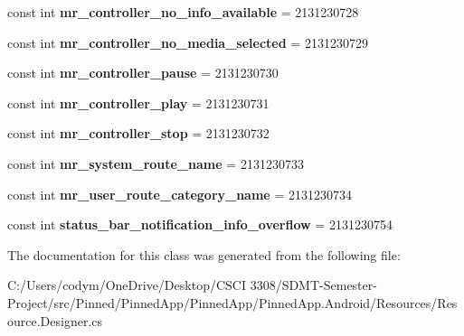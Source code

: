 \begin{DoxyCompactItemize}
\mbox{\label{class_pinned_app_1_1_droid_1_1_resource_1_1_string_ab29848b90ba4f93eec5f2a517f9a5436}} 
const int {\bfseries mr\+\_\+controller\+\_\+no\+\_\+info\+\_\+available} = 2131230728
\item 
\mbox{\label{class_pinned_app_1_1_droid_1_1_resource_1_1_string_a6ac2edca3685d179970a1c872b9169b0}} 
const int {\bfseries mr\+\_\+controller\+\_\+no\+\_\+media\+\_\+selected} = 2131230729
\item 
\mbox{\label{class_pinned_app_1_1_droid_1_1_resource_1_1_string_a5347f6fba94ff7904111a294c083fb0e}} 
const int {\bfseries mr\+\_\+controller\+\_\+pause} = 2131230730
\item 
\mbox{\label{class_pinned_app_1_1_droid_1_1_resource_1_1_string_a3b88a8bccacfc357aaf8948201512eea}} 
const int {\bfseries mr\+\_\+controller\+\_\+play} = 2131230731
\item 
\mbox{\label{class_pinned_app_1_1_droid_1_1_resource_1_1_string_aa29a4dc015b392f28554fd0fe2c2bd8a}} 
const int {\bfseries mr\+\_\+controller\+\_\+stop} = 2131230732
\item 
\mbox{\label{class_pinned_app_1_1_droid_1_1_resource_1_1_string_a3705dae31754e15326437327157df3f3}} 
const int {\bfseries mr\+\_\+system\+\_\+route\+\_\+name} = 2131230733
\item 
\mbox{\label{class_pinned_app_1_1_droid_1_1_resource_1_1_string_a384b4934bfa5dfcc9cddb137f072c4ec}} 
const int {\bfseries mr\+\_\+user\+\_\+route\+\_\+category\+\_\+name} = 2131230734
\item 
\mbox{\label{class_pinned_app_1_1_droid_1_1_resource_1_1_string_ac0d50512261a5c4380fe00d68bb78a85}} 
const int {\bfseries status\+\_\+bar\+\_\+notification\+\_\+info\+\_\+overflow} = 2131230754
\end{DoxyCompactItemize}


The documentation for this class was generated from the following file\+:\begin{DoxyCompactItemize}
\item 
C\+:/\+Users/codym/\+One\+Drive/\+Desktop/\+C\+S\+C\+I 3308/\+S\+D\+M\+T-\/\+Semester-\/\+Project/src/\+Pinned/\+Pinned\+App/\+Pinned\+App/\+Pinned\+App.\+Android/\+Resources/Resource.\+Designer.\+cs\end{DoxyCompactItemize}

